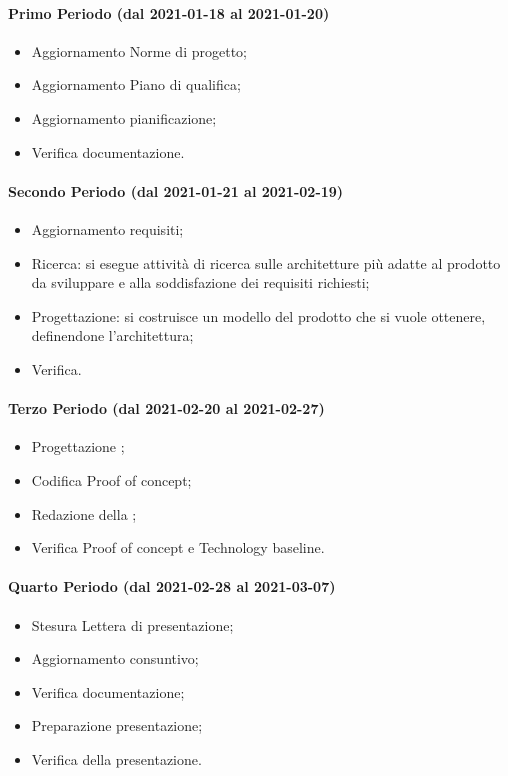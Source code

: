 \paragraph{Primo Periodo (dal 2021-01-18 al 2021-01-20)}
\begin{itemize}
	\item Aggiornamento Norme di progetto;
	\item Aggiornamento Piano di qualifica;
	\item Aggiornamento pianificazione;
	\item Verifica documentazione.
\end{itemize}

\paragraph{Secondo Periodo (dal 2021-01-21 al 2021-02-19)}
\begin{itemize}
	\item Aggiornamento requisiti;
	\item Ricerca: si esegue attività di ricerca sulle architetture più adatte al prodotto da sviluppare e alla soddisfazione dei requisiti richiesti;
	\item Progettazione: si costruisce un modello del prodotto che si vuole ottenere, definendone l'architettura;
	\item Verifica.
\end{itemize}

\paragraph{Terzo Periodo (dal 2021-02-20 al 2021-02-27)}
\begin{itemize}
	\item Progettazione ;
	\item Codifica Proof of concept;
	\item Redazione della  ;
	\item Verifica Proof of concept e Technology baseline.
\end{itemize}

\paragraph{Quarto Periodo (dal 2021-02-28 al 2021-03-07)}
\begin{itemize}
	\item Stesura Lettera di presentazione;
	\item Aggiornamento consuntivo;
	\item Verifica documentazione;
	\item Preparazione presentazione;
	\item Verifica della presentazione.
\end{itemize}

